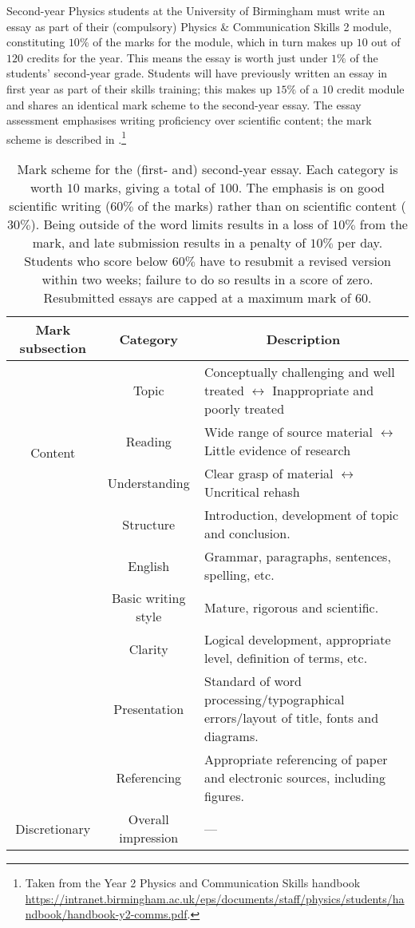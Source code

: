 Second-year Physics students at the University of Birmingham must write an essay as part of their (compulsory) Physics \& Communication Skills 2 module, constituting $10\%$ of the marks for the module, which in turn makes up $10$ out of $120$ credits for the year. This means the essay is worth just under $1\%$ of the students' second-year grade. Students will have previously written an essay in first year as part of their skills training; this makes up $15\%$ of a $10$ credit module and shares an identical mark scheme to the second-year essay. The essay assessment emphasises writing proficiency over scientific content; the mark scheme is described in .\footnote{Taken from the Year 2 Physics and Communication Skills handbook \url{https://intranet.birmingham.ac.uk/eps/documents/staff/physics/students/handbook/handbook-y2-comms.pdf}.}
\begin{table}\scriptsize
\centering
\begin{tabular}{c c p{3in}}
\toprule
\multicolumn{1}{c}{Mark subsection} & \multicolumn{1}{c}{Category} & \multicolumn{1}{c}{Description} \\
\midrule 
\multirow{4}{*}{Content} & \multirow{1}{*}{Topic}  & Conceptually challenging and well treated $\leftrightarrow$ Inappropriate and poorly treated \\
			 & Reading	  & Wide range of source material $\leftrightarrow$ Little evidence of research \\
			 & Understanding  & Clear grasp of material $\leftrightarrow$ Uncritical rehash \\
\midrule
\multirow{9}{*}{Style}	 & Structure 	  & Introduction, development of topic and conclusion. \\
			 & English  	  & Grammar, paragraphs, sentences, spelling, etc. \\
			 & Basic writing style  & Mature, rigorous and scientific. \\
			 & \multirow{1}{*}{Clarity}  & Logical development, appropriate level, definition of terms, etc. \\
			 & \multirow{1}{*}{Presentation}  & Standard of word processing/typographical errors/layout of title, fonts and diagrams. \\
			 & \multirow{1}{*}{Referencing}  & Appropriate referencing of paper and electronic sources, including figures. \\
\midrule
\multirow{1}{*}{Discretionary}	 & Overall impression & --- \\
 \bottomrule
\end{tabular}
\caption{Mark scheme for the (first- and) second-year essay. Each category is worth $10$ marks, giving a total of $100$. The emphasis is on good scientific writing ($60\%$ of the marks) rather than on scientific content ($30\%$). Being outside of the word limits results in a loss of $10\%$ from the mark, and late submission results in a penalty of $10\%$ per day. Students who score below $60\%$ have to resubmit a revised version within two weeks; failure to do so results in a score of zero. Resubmitted essays are capped at a maximum mark of $60$.}\label{tab:mark-scheme}
\end{table}

